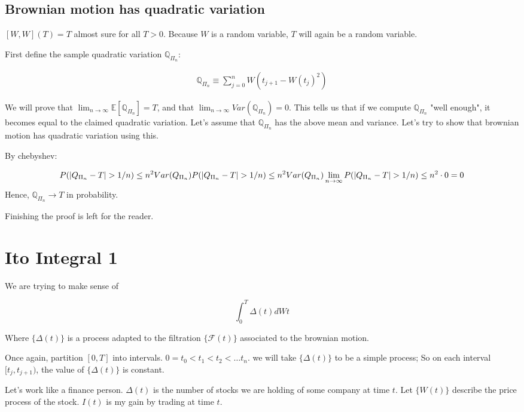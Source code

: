 \documentclass{book}
\newcommand{\F}{\ensuremath{\mathcal{F}}}
\newcommand{\Q}{\ensuremath{\mathbb{Q}}}
\newcommand{\E}{\ensuremath{\mathbb{E}}}
\theoremstyle{definition}
\begin{document}
\section{Brownian motion has quadratic variation}

$[W, W](T) = T$ almost sure for all $T > 0$. Because $W$ is a random variable,
$T$ will again be a random variable.


First define the sample quadratic variation $\Q_{\Pi_n}$:

\begin{align*}
\Q_{\Pi_n} 
\equiv \sum_{j=0}^n W(t_{j+1} - W(t_j)^2)
\end{align*}

We will prove that $\lim_{n \rightarrow \infty} \E[\Q_{\Pi_n}] = T$, and
that $\lim_{n \rightarrow \infty} Var(\Q_{\Pi_n}) = 0$. This tells us that
if we compute $\Q_{\Pi_n}$ "well enough", it becomes equal to the claimed
quadratic variation. Let's assume that $\Q_{\Pi_n}$ has the above mean and
variance. Let's try to show that brownian motion has quadratic variation using this.

By chebyshev:

$$
P(|Q_{\Pi_n} - T| > 1/n) \leq n^2 Var(Q_{\Pi_n}) \\
P(|Q_{\Pi_n} - T| > 1/n) \leq n^2 Var(Q_{\Pi_n}) \\
\lim _{n \rightarrow \infty} P(|Q_{\Pi_n} - T| > 1/n) \leq n^2 \cdot 0 = 0
$$
Hence, $\Q_{\Pi_n} \rightarrow T$ in probability. 

Finishing the proof is left for the reader.

\chapter{Ito Integral 1}

We are trying to make sense of

$$
\int_0^T \Delta(t) dWt
$$

Where $\{ \Delta(t) \}$ is a process adapted to the filtration $\{ \F(t) \}$
associated to the brownian motion.

Once again, partition $[0, T]$ into intervals. $0 = t_0 < t_1 < t_2 < \dots t_n$.
we will take $\{ \Delta(t) \}$ to be a simple process; So on each interval $[t_j, t_{j+1})$,
the value of $\{ \Delta(t) \}$ is constant. 

Let's work like a finance person. $\Delta(t)$ is the number of stocks we are holding
of some company at time $t$.  Let $\{ W(t) \}$  describe the price process of the stock.
$I(t)$ is my gain by trading at time $t$.
\end{document}
